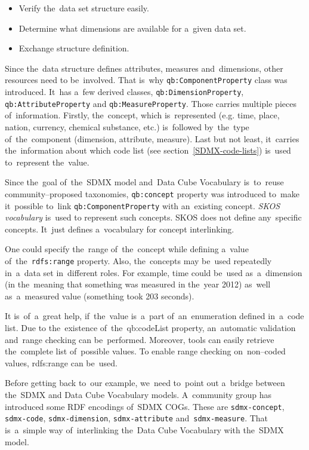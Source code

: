 \begin{itemize}
\item Verify the~data set structure easily.
\item Determine what dimensions are available for a~given data set.
\item Exchange structure definition.
\end{itemize}

\begin{sloppypar}
Since the~data structure defines attributes, measures and~dimensions, other resources need
to be~involved. That is~why \texttt{qb:ComponentProperty} class was introduced. It~has a~few derived
classes, \texttt{qb:DimensionProperty}, \texttt{qb:AttributeProperty}
and \texttt{qb:MeasureProperty}. Those carries
multiple pieces of~information. Firstly, the~concept, which is~represented (e.g. time, place,
nation, currency, chemical substance, etc.) is~followed by~the~type of~the~component
(dimension, attribute, measure). Last but not least, it~carries the~information about which
code list (see section~\ref{SDMX-code-lists}) is~used to~represent the~value.
\end{sloppypar}

Since the~goal of~the~SDMX model and~Data Cube Vocabulary is~to~reuse community--proposed
taxonomies, \texttt{qb:concept} property was introduced to~make it~possible to~link
\texttt{qb:ComponentProperty} with an~existing concept. \emph{SKOS vocabulary} is~used to
represent such concepts. SKOS does not define any~specific concepts. It~just defines
a~vocabulary for concept interlinking.

\begin{sloppypar}
One could specify the~range of~the~concept while defining a~value of~the~\texttt{rdfs:range} property.
Also, the~concepts may be~used repeatedly in~a~data set in~different roles.
For example, time could be~used as~a~dimension (in the~meaning that something was measured
in the~year 2012) as~well as~a~measured value (something took 203 seconds).
\end{sloppypar}

It is~of~a~great help, if~the~value is~a~part of~an~enumeration defined in~a~code list. Due to
the~existence of~the~qb:codeList property, an~automatic validation and~range checking
can be~performed. Moreover, tools can easily retrieve the~complete list of~possible values.
To enable range checking on~non--coded values, rdfs:range can be~used.

\begin{sloppypar}
Before getting back to~our example, we~need to~point out a~bridge between the~SDMX
and Data Cube Vocabulary models. A~community group has introduced some RDF 
encodings of~SDMX COGs. These are \texttt{sdmx-concept}, \texttt{sdmx-code}, \texttt{sdmx-dimension},
\texttt{sdmx-attribute} and~\texttt{sdmx-measure}. That is~a~simple way of~interlinking the~Data Cube
Vocabulary with the~SDMX model.
\end{sloppypar}


